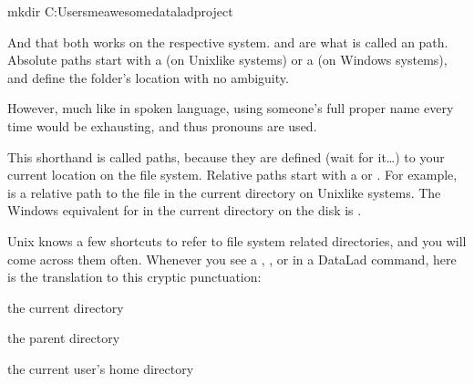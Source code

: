 \begin{sphinxVerbatim}[commandchars=\\\{\}]
\PYGZdl{} mkdir C:\PYGZbs{}Users\PYGZbs{}me\PYGZbs{}awesome\PYGZus{}datalad\PYGZus{}project
\end{sphinxVerbatim}

\sphinxAtStartPar
And that both works on the respective system.  and  are what is called an 
path.
Absolute paths  start with a \sphinxcode{\sphinxupquote{/}} (on Unix\sphinxhyphen{}like systems) or a \sphinxcode{\sphinxupquote{\textbackslash{}}} (on Windows systems), and define the folder’s location with no ambiguity.

\sphinxAtStartPar
However, much like in spoken language, using someone’s full proper name every
time would be exhausting, and thus pronouns are used.

\sphinxAtStartPar
This shorthand is called  paths, because they are defined (wait for it…)
 to your current location on the file system. Relative paths  start
with a \sphinxcode{\sphinxupquote{/}} or \sphinxcode{\sphinxupquote{\textbackslash{}}}.
For example,  is a relative path to the file  in the current directory on Unix\sphinxhyphen{}like systems.
The Windows equivalent for  in the current directory on the  disk is .

\sphinxAtStartPar
Unix knows a few shortcuts to refer to file system related directories, and you will
come across them often. Whenever you see a , , or \sphinxcode{\sphinxupquote{\textasciitilde{}}} in a DataLad command,
here is the translation to this cryptic punctuation:
\begin{description}
\sphinxAtStartPar
the current directory

\sphinxAtStartPar
the parent directory

\sphinxlineitem{\sphinxcode{\sphinxupquote{\textasciitilde{}}}}
\sphinxAtStartPar
the current user’s home directory

\end{description}

